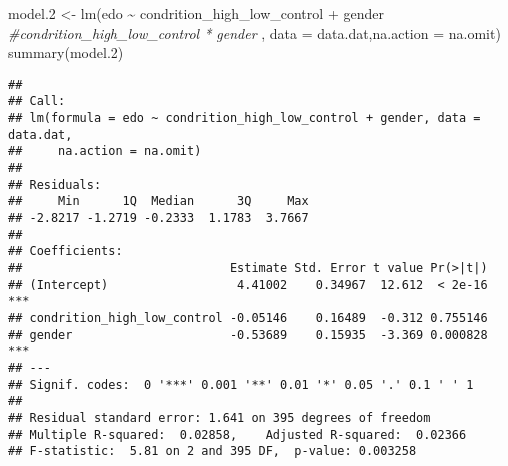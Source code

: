 \documentclass[
]{article}
\newenvironment{Shaded}{\begin{snugshade}}{\end{snugshade}}
\newcommand{\AttributeTok}[1]{\textcolor[rgb]{0.77,0.63,0.00}{#1}}
\newcommand{\CommentTok}[1]{\textcolor[rgb]{0.56,0.35,0.01}{\textit{#1}}}
\newcommand{\DecValTok}[1]{\textcolor[rgb]{0.00,0.00,0.81}{#1}}
\newcommand{\FloatTok}[1]{\textcolor[rgb]{0.00,0.00,0.81}{#1}}
\newcommand{\FunctionTok}[1]{\textcolor[rgb]{0.00,0.00,0.00}{#1}}
\newcommand{\NormalTok}[1]{#1}
\newcommand{\OtherTok}[1]{\textcolor[rgb]{0.56,0.35,0.01}{#1}}
\newcommand{\SpecialCharTok}[1]{\textcolor[rgb]{0.00,0.00,0.00}{#1}}
\begin{document}
\begin{Shaded}
\begin{Highlighting}[]
\NormalTok{model}\FloatTok{.2} \OtherTok{\textless{}{-}} \FunctionTok{lm}\NormalTok{(edo }\SpecialCharTok{\textasciitilde{}}\NormalTok{ condrition\_high\_low\_control }\SpecialCharTok{+}\NormalTok{ gender  }\CommentTok{\#condrition\_high\_low\_control * gender}
\NormalTok{              , }\AttributeTok{data =}\NormalTok{ data.dat,}\AttributeTok{na.action =}\NormalTok{ na.omit)}
\FunctionTok{summary}\NormalTok{(model}\FloatTok{.2}\NormalTok{)}
\end{Highlighting}
\end{Shaded}

\begin{verbatim}
## 
## Call:
## lm(formula = edo ~ condrition_high_low_control + gender, data = data.dat, 
##     na.action = na.omit)
## 
## Residuals:
##     Min      1Q  Median      3Q     Max 
## -2.8217 -1.2719 -0.2333  1.1783  3.7667 
## 
## Coefficients:
##                             Estimate Std. Error t value Pr(>|t|)    
## (Intercept)                  4.41002    0.34967  12.612  < 2e-16 ***
## condrition_high_low_control -0.05146    0.16489  -0.312 0.755146    
## gender                      -0.53689    0.15935  -3.369 0.000828 ***
## ---
## Signif. codes:  0 '***' 0.001 '**' 0.01 '*' 0.05 '.' 0.1 ' ' 1
## 
## Residual standard error: 1.641 on 395 degrees of freedom
## Multiple R-squared:  0.02858,    Adjusted R-squared:  0.02366 
## F-statistic:  5.81 on 2 and 395 DF,  p-value: 0.003258
\end{verbatim}

\begin{Shaded}
\end{Shaded}
\end{document}
